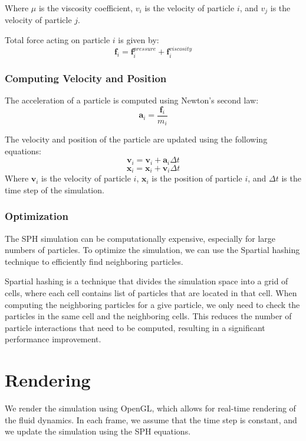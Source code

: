 \documentclass[a4paper]{article}
\begin{document}
Where $\mu$ is the viscosity coefficient, $v_i$ is the velocity of particle $i$, and $v_j$ is the velocity of particle $j$.

Total force acting on particle $i$ is given by:
\[
  \mathbf{f}_i = \mathbf{f}^{pressure}_i + \mathbf{f}^{viscosity}_i
\]

\subsubsection{Computing Velocity and Position}

The acceleration of a particle is computed using Newton's second law:
\[
  \mathbf{a}_i = \frac{\mathbf{f}_i}{m_i}
\]

The velocity and position of the particle are updated using the following equations:
\[
  \mathbf{v}_i = \mathbf{v}_i + \mathbf{a}_i \Delta t
\]
\[
  \mathbf{x}_i = \mathbf{x}_i + \mathbf{v}_i \Delta t
\]
Where $\mathbf{v}_i$ is the velocity of particle $i$, $\mathbf{x}_i$ is the position of particle $i$, and $\Delta t$ is the time step of the simulation.

\subsubsection{Optimization}

The SPH simulation can be computationally expensive, especially for large numbers of particles.
To optimize the simulation, we can use the Spartial hashing technique to efficiently find neighboring particles.

Spartial hashing is a technique that divides the simulation space into a grid of cells, where each cell contains list of particles that are located in that cell.
When computing the neighboring particles for a give particle, we only need to check the particles in the same cell and the neighboring cells.
This reduces the number of particle interactions that need to be computed, resulting in a significant performance improvement.

\section{Rendering}

We render the simulation using OpenGL, which allows for real-time rendering of the fluid dynamics.
In each frame, we assume that the time step is constant, and we update the simulation using the SPH equations.

\medskip
\end{document}
